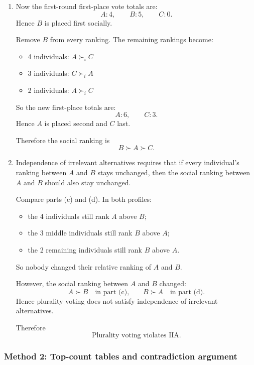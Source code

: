 \documentclass[12pt]{article}
\begin{document}
\begin{enumerate}[label=(\alph*)]
    Therefore the plurality-voting social ranking is
    \[
    \boxed{A \succ B \succ C.}
    \]

    \item
    Now the first-round first-place vote totals are:
    \[
    A:4,\qquad B:5,\qquad C:0.
    \]
    Hence $B$ is placed first socially.

    Remove $B$ from every ranking. The remaining rankings become:
    \begin{itemize}[leftmargin=2em]
        \item 4 individuals: $A \succ_i C$
        \item 3 individuals: $C \succ_i A$
        \item 2 individuals: $A \succ_i C$
    \end{itemize}
    So the new first-place totals are:
    \[
    A:6,\qquad C:3.
    \]
    Hence $A$ is placed second and $C$ last.

    Therefore the social ranking is
    \[
    \boxed{B \succ A \succ C.}
    \]

    \item
    Independence of irrelevant alternatives requires that if every individual's ranking between $A$ and $B$ stays unchanged, then the social ranking between $A$ and $B$ should also stay unchanged.

    Compare parts (c) and (d). In both profiles:
    \begin{itemize}[leftmargin=*]
        \item the 4 individuals still rank $A$ above $B$;
        \item the 3 middle individuals still rank $B$ above $A$;
        \item the 2 remaining individuals still rank $B$ above $A$.
    \end{itemize}
    So nobody changed their relative ranking of $A$ and $B$.

    However, the social ranking between $A$ and $B$ changed:
    \[
    A \succ B \quad\text{in part (c),}
    \qquad
    B \succ A \quad\text{in part (d).}
    \]
    Hence plurality voting does not satisfy independence of irrelevant alternatives.

    Therefore
    \[
    \boxed{\text{Plurality voting violates IIA.}}
    \]
\end{enumerate}

\subsubsection{Method 2: Top-count tables and contradiction argument}
\end{document}
